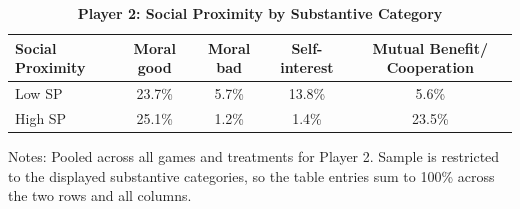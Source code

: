 \begin{table}[!htbp]
\centering
\caption{\textbf{Player 2: Social Proximity by Substantive Category}}
\label{tab:player2_sp_by_category}
\begin{tabular}{lcccc}
\toprule
Social Proximity & Moral good & Moral bad & Self-interest & Mutual Benefit/ Cooperation \\
\midrule
Low SP & 23.7\% & 5.7\% & 13.8\% & 5.6\% \\
High SP & 25.1\% & 1.2\% & 1.4\% & 23.5\% \\
\bottomrule
\end{tabular}
\begin{flushleft}
\footnotesize Notes: Pooled across all games and treatments for Player 2. Sample is restricted to the displayed substantive categories, so the table entries sum to 100\% across the two rows and all columns.
\end{flushleft}
\end{table}
